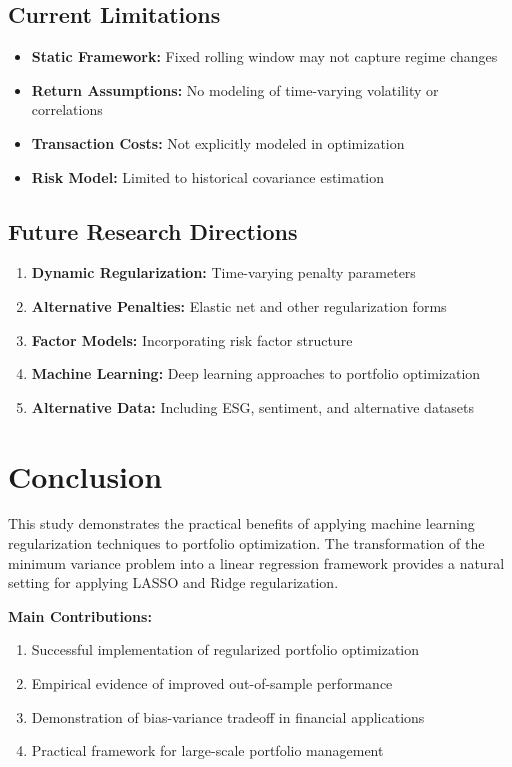 \documentclass[12pt]{article}
\begin{document}
\subsection{Current Limitations}
\begin{itemize}
    \item \textbf{Static Framework:} Fixed rolling window may not capture regime changes
    \item \textbf{Return Assumptions:} No modeling of time-varying volatility or correlations
    \item \textbf{Transaction Costs:} Not explicitly modeled in optimization
    \item \textbf{Risk Model:} Limited to historical covariance estimation
\end{itemize}

\subsection{Future Research Directions}
\begin{enumerate}
    \item \textbf{Dynamic Regularization:} Time-varying penalty parameters
    \item \textbf{Alternative Penalties:} Elastic net and other regularization forms
    \item \textbf{Factor Models:} Incorporating risk factor structure
    \item \textbf{Machine Learning:} Deep learning approaches to portfolio optimization
    \item \textbf{Alternative Data:} Including ESG, sentiment, and alternative datasets
\end{enumerate}

\section{Conclusion}

This study demonstrates the practical benefits of applying machine learning regularization techniques to portfolio optimization. The transformation of the minimum variance problem into a linear regression framework provides a natural setting for applying LASSO and Ridge regularization.

\textbf{Main Contributions:}
\begin{enumerate}
    \item Successful implementation of regularized portfolio optimization
    \item Empirical evidence of improved out-of-sample performance
    \item Demonstration of bias-variance tradeoff in financial applications
    \item Practical framework for large-scale portfolio management
\end{enumerate}
\end{document}
